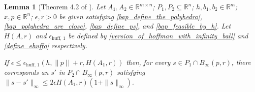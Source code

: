 \documentclass{article}
\newtheorem{lemma}[theorem]{Lemma}
\theoremstyle{case}
\numberwithin{theorem}{subsection}
\newcommand{\ehuffo}{{\epsilon_{\textrm{huff, 1}}}}
\newcommand{\bpr}{{B_{\infty}\left(p, r\right)}}
\newcommand{\Rm}{\mathbb R^m}
\newcommand{\Rn}{\mathbb R^n}
\begin{document}


\begin{lemma}[Theorem 4.2 of \cite{perturbations_of_linear_inequalities}]
\label{4_2}
Let 
$A_1, A_2 \in \mathbb R ^ {m \times n}$;
$P_1, P_2 \subseteq \Rn$;
$h, b_1, b_2 \in \Rm$;
$\hat x, p \in \Rn$;
$\epsilon, r > 0$
be given satisfying
\cref{bap_define_the_polyhedra}, \cref{bap_polyhedra_are_close}, \cref{bap_define_ps}, and \cref{bap_feasible_by_h}.
Let $H\left(A, r\right)$ and $\ehuffo$ be defined by \cref{version_of_hoffman_with_infinity_ball} and \cref{define_ehuffo} respectively.


If
$\epsilon \le \ehuffo \left(h, \|p\| + r, H\left(A_1, r\right)\right)$
then, for every $s \in P_1 \cap \bpr$,
there corresponds an $s'$ in $P_2 \cap \bpr$ satisfying 
$\|s - s'\|_{\infty}\le 2\epsilon H\left(A_1, r\right)\left(1 + \|s\|_{\infty}\right)$.
\end{lemma}
\end{document}
